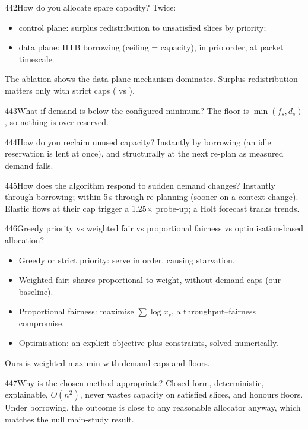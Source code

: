 \begin{qa}{442}{How do you allocate spare capacity?}
Twice:
\begin{itemize}
\item control plane: surplus redistribution to unsatisfied slices by priority;
\item data plane: HTB borrowing (ceiling = capacity), in prio order, at packet timescale.
\end{itemize}
The ablation shows the data-plane mechanism dominates. Surplus redistribution matters only with strict caps
(\NAblSchoolFullStrictUtil{} vs \NAblSchoolNoSurplusStrictUtil).
\end{qa}

\begin{qa}{443}{What if demand is below the configured minimum?}
The floor is $\min(f_s,d_s)$, so nothing is over-reserved.
\end{qa}

\begin{qa}{444}{How do you reclaim unused capacity?}
Instantly by borrowing (an idle reservation is lent at once), and structurally at the next re-plan as measured demand
falls.
\end{qa}

\begin{qa}{445}{How does the algorithm respond to sudden demand changes?}
Instantly through borrowing; within 5\,s through re-planning (sooner on a context change). Elastic flows at their cap
trigger a 1.25$\times$ probe-up; a Holt forecast tracks trends.
\end{qa}

\begin{qa}{446}{Greedy priority vs weighted fair vs proportional fairness vs optimisation-based allocation?}
\begin{itemize}
\item Greedy or strict priority: serve in order, causing starvation.
\item Weighted fair: shares proportional to weight, without demand caps (our  baseline).
\item Proportional fairness: maximise $\sum\log x_s$, a throughput--fairness compromise.
\item Optimisation: an explicit objective plus constraints, solved numerically.
\end{itemize}
Ours is weighted max-min with demand caps and floors.
\end{qa}

\begin{qa}{447}{Why is the chosen method appropriate?}
Closed form, deterministic, explainable, $O(n^2)$, never wastes capacity on satisfied slices, and honours floors.
Under borrowing, the outcome is close to any reasonable allocator anyway, which matches the null main-study result.
\end{qa}

